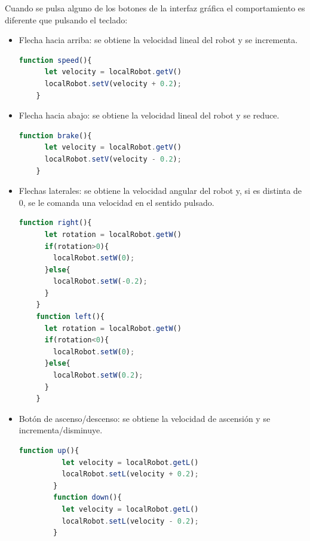 Cuando se pulsa alguno de los botones de la interfaz gráfica el comportamiento es diferente que pulsando el teclado: 
\begin{itemize}
    \item Flecha hacia arriba: se obtiene la velocidad lineal del robot y se incrementa.
    \begin{lstlisting}[language=javascript,label=list:speed]
    function speed(){
      let velocity = localRobot.getV()
      localRobot.setV(velocity + 0.2);
    }
    \end{lstlisting}
    \item Flecha hacia abajo: se obtiene la velocidad lineal del robot y se reduce. 
    \begin{lstlisting}[language=javascript,label=list:brake]
   function brake(){
      let velocity = localRobot.getV()
      localRobot.setV(velocity - 0.2);
    }
    \end{lstlisting}
    \item Flechas laterales: se obtiene la velocidad angular del robot y, si es distinta de 0, se le comanda una velocidad en el sentido pulsado. 
    \begin{lstlisting}[language=javascript,label=list:right]
   function right(){
      let rotation = localRobot.getW()
      if(rotation>0){
        localRobot.setW(0);
      }else{
        localRobot.setW(-0.2);
      }
    }
    function left(){
      let rotation = localRobot.getW()
      if(rotation<0){
        localRobot.setW(0);
      }else{
        localRobot.setW(0.2);
      }
    }
    \end{lstlisting}
    \item Botón de ascenso/descenso: se obtiene la velocidad de ascensión y se incrementa/disminuye.
    \begin{lstlisting}[language=javascript,label=list:up]
        function up(){
          let velocity = localRobot.getL()
          localRobot.setL(velocity + 0.2);
        }
        function down(){
          let velocity = localRobot.getL()
          localRobot.setL(velocity - 0.2);
        }

    \end{lstlisting}
    \end{itemize}

